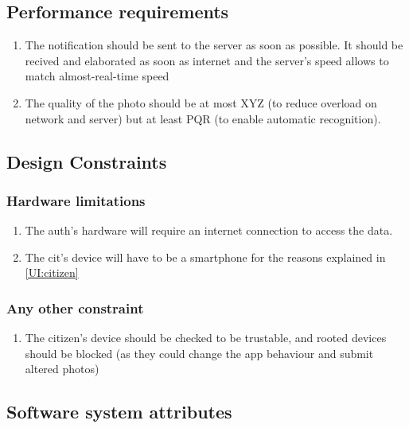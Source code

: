\documentclass{article}
\newcommand{\enum}[1]{\texttt{#1.\arabic*}}
\begin{document}
	\subsection{Performance requirements}
		\begin{enumerate}[label=\enum{P}]
			\item \label{P:speed}The notification should be sent to the server as soon as possible. It should be recived and elaborated as soon as internet and the server's speed allows to match almost-real-time speed
			\item \label{P:Image quality}The quality of the photo should be at most XYZ (to reduce overload on network and server) but at least PQR (to enable automatic recognition).
		\end{enumerate}
		
	\subsection{Design Constraints}
	
		\subsubsection{Hardware limitations} 
			\begin{enumerate}[label=\enum{HW}]
				\item \label{HW:auth} The auth's hardware will require an internet connection to access the data.
				\item \label{HW:cit} The cit's device will have to be a smartphone for the reasons explained in \ref{UI:citizen}
			\end{enumerate}					
		
		\subsubsection{Any other constraint} 
			\begin{enumerate}[label=\enum{OT}]
				\item \label{OT:cit device}The citizen's device should be checked to be trustable, and rooted devices should be blocked (as they could change the app behaviour and submit altered photos)
			\end{enumerate}		
		
	\subsection{Software system attributes}
	
\end{document}

